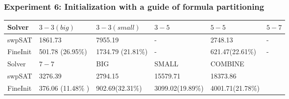 \documentclass[12pt,a4paper,twoside]{scrartcl}
\numberwithin{equation}{section}
\begin{document}
\subsubsection{Experiment 6: Initialization with a guide of formula partitioning} 
\label{sec:Experiment 6}
\begin{table}[h!]
\begin{center}
    \begin{tabular}{|l|l|l|l|l|p{1cm}|}
\hline 
    Solver &$3-3(big)$&$3-3(small)$&$3-5$&$5-5$&$5-7$\\ \hline
   	swpSAT &1861.73	&7955.19 &-	&2748.13&-\\ \hline
    FineInit& 501.78 (26.95\%)& 1734.79 (21.81\%) &-&621.47(22.61\%)&- \\ \hline
     \hline
    Solver & $7-7$ & BIG & SMALL & COMBINE &\\ \hline
    swpSAT &3276.39	&	2794.15 &15579.71& 18373.86&\\ \hline
    FineInit&376.06 (11.48\% )&902.69(32.31\%) & 3099.02(19.89\%)&4001.71(21.78\%)&\\ \hline
\end{tabular}
\end{center}
\end{table} 
\end{document}
